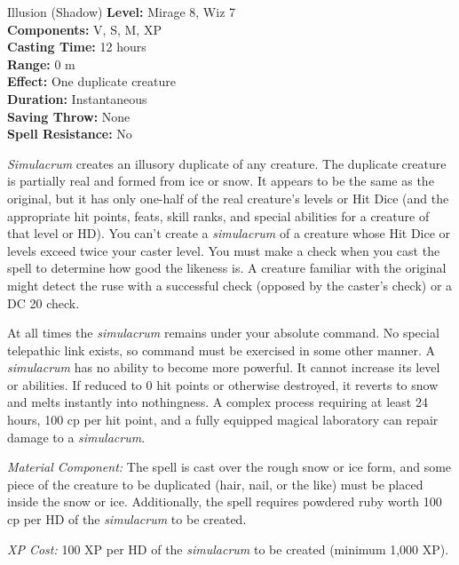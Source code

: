 {Illusion (Shadow)}
{
	\textbf{Level:}
	Mirage 8, Wiz 7\\
	\textbf{Components:}
	V, S, M, XP\\
	\textbf{Casting Time:}
	12 hours\\
	\textbf{Range:}
	0 m\\
	\textbf{Effect:}
	One duplicate creature\\
	\textbf{Duration:}
	Instantaneous\\
	\textbf{Saving Throw:}
	None\\
	\textbf{Spell Resistance:}
	No\\
}
{
	\emph{Simulacrum} creates an illusory duplicate of any creature. The duplicate creature is partially real and formed from ice or snow. It appears to be the same as the original, but it has only one-half of the real creature's levels or Hit Dice (and the appropriate hit points, feats, skill ranks, and special abilities for a creature of that level or HD). You can't create a \emph{simulacrum} of a creature whose Hit Dice or levels exceed twice your caster level. You must make a  check when you cast the spell to determine how good the likeness is. A creature familiar with the original might detect the ruse with a successful  check (opposed by the caster's  check) or a DC 20  check.

	At all times the \emph{simulacrum} remains under your absolute command. No special telepathic link exists, so command must be exercised in some other manner. A \emph{simulacrum} has no ability to become more powerful. It cannot increase its level or abilities. If reduced to 0 hit points or otherwise destroyed, it reverts to snow and melts instantly into nothingness. A complex process requiring at least 24 hours, 100 cp per hit point, and a fully equipped magical laboratory can repair damage to a \emph{simulacrum}.

	\textit{Material Component:}
	The spell is cast over the rough snow or ice form, and some piece of the creature to be duplicated (hair, nail, or the like) must be placed inside the snow or ice. Additionally, the spell requires powdered ruby worth 100 cp per HD of the \emph{simulacrum} to be created.

	\textit{XP Cost:}
	100 XP per HD of the \emph{simulacrum} to be created (minimum 1,000 XP).

}
